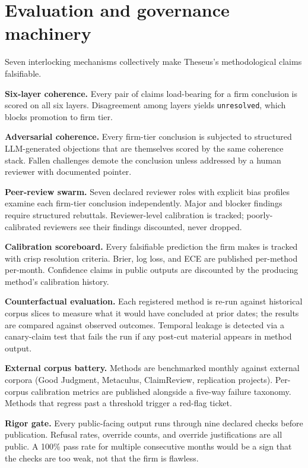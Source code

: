 \documentclass[11pt,letterpaper]{article}
\begin{document}
\section{Evaluation and governance machinery}

Seven interlocking mechanisms collectively make Theseus's methodological claims falsifiable.

\textbf{Six-layer coherence.} Every pair of claims load-bearing for a firm conclusion is scored on all six layers. Disagreement among layers yields \texttt{unresolved}, which blocks promotion to firm tier.

\textbf{Adversarial coherence.} Every firm-tier conclusion is subjected to structured LLM-generated objections that are themselves scored by the same coherence stack. Fallen challenges demote the conclusion unless addressed by a human reviewer with documented pointer.

\textbf{Peer-review swarm.} Seven declared reviewer roles with explicit bias profiles examine each firm-tier conclusion independently. Major and blocker findings require structured rebuttals. Reviewer-level calibration is tracked; poorly-calibrated reviewers see their findings discounted, never dropped.

\textbf{Calibration scoreboard.} Every falsifiable prediction the firm makes is tracked with crisp resolution criteria. Brier, log loss, and ECE are published per-method per-month. Confidence claims in public outputs are discounted by the producing method's calibration history.

\textbf{Counterfactual evaluation.} Each registered method is re-run against historical corpus slices to measure what it would have concluded at prior dates; the results are compared against observed outcomes. Temporal leakage is detected via a canary-claim test that fails the run if any post-cut material appears in method output.

\textbf{External corpus battery.} Methods are benchmarked monthly against external corpora (Good Judgment, Metaculus, ClaimReview, replication projects). Per-corpus calibration metrics are published alongside a five-way failure taxonomy. Methods that regress past a threshold trigger a red-flag ticket.

\textbf{Rigor gate.} Every public-facing output runs through nine declared checks before publication. Refusal rates, override counts, and override justifications are all public. A 100\% pass rate for multiple consecutive months would be a sign that the checks are too weak, not that the firm is flawless.
\end{document}

